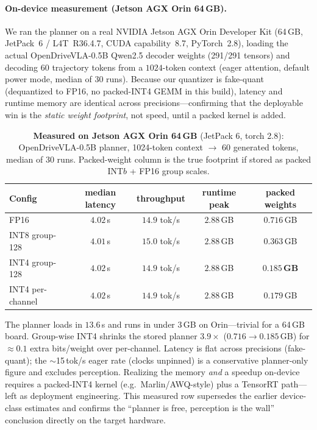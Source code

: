 \documentclass[11pt]{article}
\begin{document}
\paragraph{On-device measurement (Jetson AGX Orin 64\,GB).} We ran the planner on a real
NVIDIA Jetson AGX Orin Developer Kit (64\,GB, JetPack~6 / L4T~R36.4.7, CUDA capability~8.7,
PyTorch~2.8), loading the actual OpenDriveVLA-0.5B Qwen2.5 decoder weights (291/291 tensors) and
decoding $60$ trajectory tokens from a $1024$-token context (eager attention, default power mode,
median of $30$ runs). Because our quantizer is fake-quant (dequantized to FP16, no packed-INT4
GEMM in this build), latency and runtime memory are identical across precisions---confirming that
the deployable win is the \emph{static weight footprint}, not speed, until a packed kernel is added.
\begin{table}[h]\centering
\caption{\textbf{Measured on Jetson AGX Orin 64\,GB} (JetPack 6, torch 2.8): OpenDriveVLA-0.5B
planner, 1024-token context $\to$ 60 generated tokens, median of 30 runs. Packed-weight column is
the true footprint if stored as packed INT$b$ + FP16 group scales.}
\label{tab:orin}
\begin{tabular}{lcccc}
\toprule
Config & median latency & throughput & runtime peak & packed weights \\
\midrule
FP16             & $4.02$\,s & $14.9$ tok/s & $2.88$\,GB & $0.716$\,GB \\
INT8 group-128   & $4.01$\,s & $15.0$ tok/s & $2.88$\,GB & $0.363$\,GB \\
INT4 group-128   & $4.02$\,s & $14.9$ tok/s & $2.88$\,GB & \textbf{$0.185$\,GB} \\
INT4 per-channel & $4.02$\,s & $14.9$ tok/s & $2.88$\,GB & $0.179$\,GB \\
\bottomrule
\end{tabular}
\end{table}
The planner loads in $13.6$\,s and runs in under $3$\,GB on Orin---trivial for a 64\,GB board.
Group-wise INT4 shrinks the stored planner $3.9\times$ ($0.716\to 0.185$\,GB) for $\approx 0.1$
extra bits/weight over per-channel. Latency is flat across precisions (fake-quant); the
$\sim$15\,tok/s eager rate (clocks unpinned) is a conservative planner-only figure and excludes
perception. Realizing the memory \emph{and} a speedup on-device requires a packed-INT4 kernel
(e.g.\ Marlin/AWQ-style) plus a TensorRT path---left as deployment engineering. This measured
row supersedes the earlier device-class estimates and confirms the ``planner is free, perception
is the wall'' conclusion directly on the target hardware.
\end{document}

